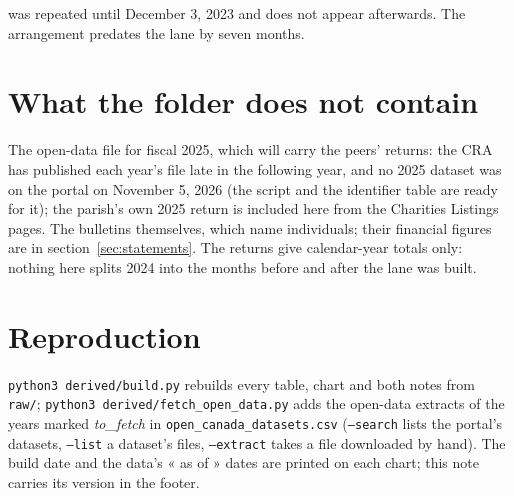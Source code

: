 \documentclass[11pt,letterpaper]{article}
\begin{document}
was repeated until December 3, 2023 and does not appear afterwards. The arrangement predates the lane by seven months.

\section{What the folder does not contain}

The open-data file for fiscal 2025, which will carry the peers' returns: the CRA has published each year's file late in the following year, and no 2025 dataset was on the portal on November 5, 2026 (the script and the identifier table are ready for it); the parish's own 2025 return is included here from the Charities Listings pages. The bulletins themselves, which name individuals; their financial figures are in section~\ref{sec:statements}. The returns give calendar-year totals only: nothing here splits 2024 into the months before and after the lane was built.

\section{Reproduction}

\texttt{python3 derived/build.py} rebuilds every table, chart and both notes from \texttt{raw/}; \texttt{python3 derived/fetch\_open\_data.py} adds the open-data extracts of the years marked \emph{to\_fetch} in \texttt{open\_canada\_datasets.csv} (\texttt{--search} lists the portal's datasets, \texttt{--list} a dataset's files, \texttt{--extract} takes a file downloaded by hand). The build date and the data's « as of » dates are printed on each chart; this note carries its version in the footer.
\end{document}
